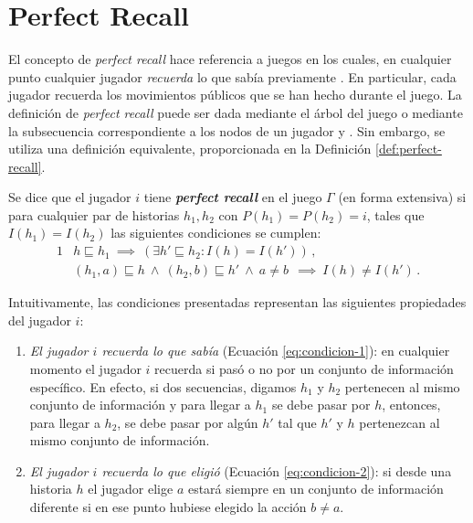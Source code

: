 \section{Perfect Recall}

El concepto de \textit{perfect recall} hace referencia a juegos en los cuales, en cualquier punto cualquier jugador \textit{recuerda} lo que sabía previamente \cite[p.~203]{bib:course-game-theory}. En particular, cada jugador recuerda los movimientos públicos que se han hecho durante el juego. La definición de \textit{perfect recall} puede ser dada mediante el árbol del juego \cite{bib:conceptos-basicos} o mediante la subsecuencia correspondiente a los nodos de un jugador \cite[p.~203]{bib:course-game-theory} y \cite[p.~44]{bib:handbook-blai}. Sin embargo, se utiliza una definición equivalente, proporcionada en la Definición \ref{def:perfect-recall}.

\begin{definition}
\label{def:perfect-recall}
Se dice que el jugador $i$ tiene \textbf{\textit{perfect recall}} en el juego $\Gamma$ (en forma extensiva) si para cualquier par de historias $h_1, h_2$ con $P(h_1) = P(h_2) = i$, tales que $I(h_1) = I(h_2)$ las siguientes condiciones se cumplen:
\begin{alignat}{1}
& h \sqsubseteq h_1\ \implies\ (\exists h' \sqsubseteq h_2 : I(h) = I(h')) \,,
\label{eq:condicion-1}\\
& (h_1, a) \sqsubseteq h\  \land\ (h_2, b)\sqsubseteq h'\ \land\ a \neq b\ \  \implies\ I(h) \neq I(h') \,.
\label{eq:condicion-2}
\end{alignat}
\end{definition}

Intuitivamente, las condiciones presentadas representan las siguientes propiedades del jugador $i$:
\begin{enumerate}[noitemsep]
\item \textit{El jugador $i$ recuerda lo que sabía} (Ecuación \ref{eq:condicion-1}): en cualquier momento el jugador $i$ recuerda si pasó o no por un conjunto de información específico. En efecto, si dos secuencias, digamos $h_1$ y $h_2$ pertenecen al mismo conjunto de información y para llegar a $h_1$ se debe pasar por $h$, entonces, para llegar a $h_2$, se debe pasar por algún $h'$ tal que $h'$ y $h$ pertenezcan al mismo conjunto de información. 

\item \textit{El jugador $i$ recuerda lo que eligió} (Ecuación \ref{eq:condicion-2}): si desde una historia $h$ el jugador elige $a$ estará siempre en un conjunto de información diferente si en ese punto hubiese elegido la acción $b \neq a$.
\end{enumerate}

